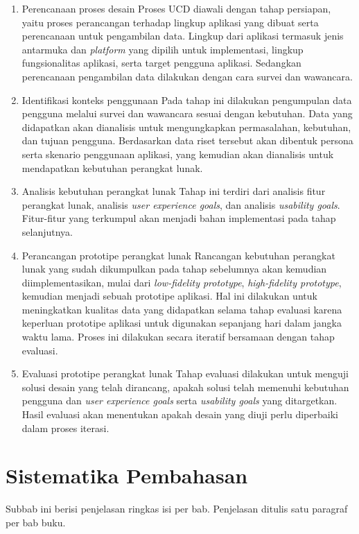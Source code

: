 \begin{enumerate}
  \item Perencanaan proses desain
  \subitem Proses UCD diawali dengan tahap persiapan, yaitu proses perancangan terhadap lingkup aplikasi yang dibuat serta perencanaan untuk pengambilan data. Lingkup dari aplikasi termasuk jenis antarmuka dan \textit{platform} yang dipilih untuk implementasi, lingkup fungsionalitas aplikasi, serta target pengguna aplikasi. Sedangkan perencanaan pengambilan data dilakukan dengan cara survei dan wawancara.

  \item Identifikasi konteks penggunaan
  \subitem Pada tahap ini dilakukan pengumpulan data pengguna melalui survei dan wawancara sesuai dengan kebutuhan. Data yang didapatkan akan dianalisis untuk mengungkapkan permasalahan, kebutuhan, dan tujuan pengguna. Berdasarkan data riset tersebut akan dibentuk persona serta skenario penggunaan aplikasi, yang kemudian akan dianalisis untuk mendapatkan kebutuhan perangkat lunak.
   
  \item Analisis kebutuhan perangkat lunak
  \subitem Tahap ini terdiri dari analisis fitur perangkat lunak, analisis \textit{user experience goals}, dan analisis \textit{usability goals}. Fitur-fitur yang terkumpul akan menjadi bahan implementasi pada tahap selanjutnya.
  
  \item Perancangan prototipe perangkat lunak
  \subitem Rancangan kebutuhan perangkat lunak yang sudah dikumpulkan pada tahap sebelumnya akan kemudian diimplementasikan, mulai dari \textit{low-fidelity prototype}, \textit{high-fidelity prototype}, kemudian menjadi sebuah prototipe aplikasi. Hal ini dilakukan untuk meningkatkan kualitas data yang didapatkan selama tahap evaluasi karena keperluan prototipe aplikasi untuk digunakan sepanjang hari dalam jangka waktu lama. Proses ini dilakukan secara iteratif bersamaan dengan tahap evaluasi.
  
  \item Evaluasi prototipe perangkat lunak
  \subitem Tahap evaluasi dilakukan untuk menguji solusi desain yang telah dirancang, apakah solusi telah memenuhi kebutuhan pengguna dan \textit{user experience goals} serta \textit{usability goals} yang ditargetkan. Hasil evaluasi akan menentukan apakah desain yang diuji perlu diperbaiki dalam proses iterasi.
  
\end{enumerate}


\section{Sistematika Pembahasan}

Subbab ini berisi penjelasan ringkas isi per bab. Penjelasan ditulis satu paragraf per bab buku.
